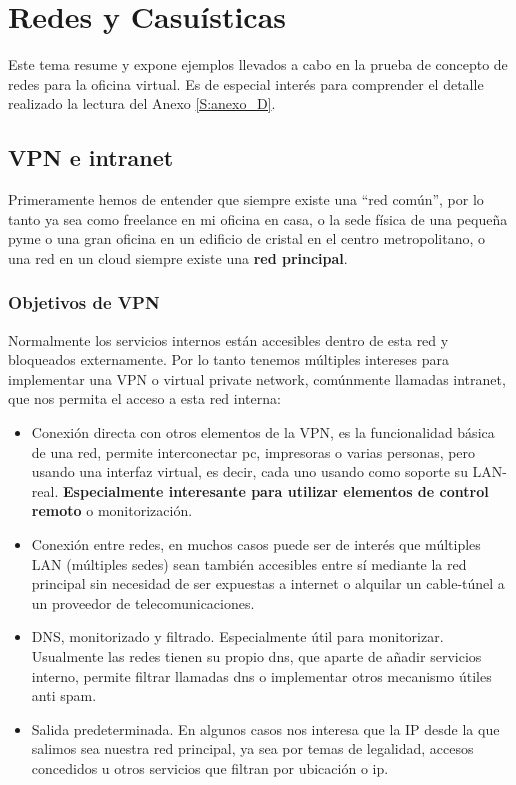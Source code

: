 \chapter{Redes y Casuísticas}\label{S:tema_3}
Este tema resume y expone ejemplos llevados a cabo en la prueba de concepto de redes para la oficina virtual. Es de especial interés para comprender el detalle realizado la lectura del Anexo \ref{S:anexo_D}.

\section{VPN e intranet}
Primeramente hemos de entender que siempre existe una “red común”, por lo tanto ya sea como freelance en mi oficina en casa, o la sede física de una pequeña pyme o una gran oficina en un edificio de cristal en el centro metropolitano, o una red en un cloud siempre existe una \textbf{red principal}.

\subsection{Objetivos de VPN}
Normalmente los servicios internos están accesibles dentro de esta red y bloqueados externamente. Por lo tanto tenemos múltiples intereses para implementar una VPN o virtual private network, comúnmente llamadas intranet, que nos permita el acceso a esta red interna:
\begin{itemize}
    \item Conexión directa con otros elementos de la VPN, es la funcionalidad básica de una red, permite interconectar pc, impresoras o varias personas, pero usando una interfaz virtual, es decir, cada uno usando como soporte su LAN-real.\textbf{ Especialmente interesante para utilizar elementos de control remoto} o monitorización.

    \item Conexión entre redes, en muchos casos puede ser de interés que múltiples LAN (múltiples sedes) sean también accesibles entre sí mediante la red principal sin necesidad de ser expuestas a internet o alquilar un cable-túnel a un proveedor de telecomunicaciones.
    \item DNS, monitorizado y filtrado. Especialmente útil para monitorizar. Usualmente las redes tienen su propio dns, que aparte de añadir servicios interno, permite filtrar llamadas dns o implementar otros mecanismo útiles anti spam\cite{c_pi_hole}.
    \item Salida predeterminada. En algunos casos nos interesa que la IP desde la que salimos sea nuestra red principal, ya sea por temas de legalidad, accesos concedidos u otros servicios que filtran por ubicación o ip.
\end{itemize}

